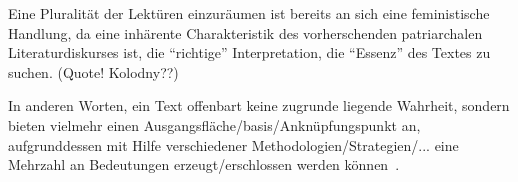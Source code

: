 Eine Pluralität der Lektüren einzuräumen ist bereits an sich eine feministische Handlung,
da eine inhärente Charakteristik des vorherschenden patriarchalen Literaturdiskurses ist, die ``richtige'' Interpretation, die ``Essenz'' des Textes zu suchen. (Quote! Kolodny??)
\begin{comment}
   * Pluralität (vlt in die Intro vorziehen)
     Annette Kolodny: "In my view, our purpose is not and should not be the formulation of any single reading method or potentially procrustean set of critical procedures[...] Instead, as I se it, our task is to initiate nothing less than a playful pluralism, responsice to the possibilities of multiple critical schools and methods, but captive of none.."

    ** Annette Kolodny: "we appropriate meaning from a text according to what we need (or desire) or, in other words, according to the critical assumptions or predispositions (conscious or not) that we bring to it. And we appropriate different meanings, or report different gleanings, at different times-even from the same text-according to our changed assumptions, circumstances, and requirements."
    ** Annette Kolodny: "It can provide that, but, I must add, too often it does not. Frequently our reading habits become fixed" <--- relation zum Kanon
\end{comment}

In anderen Worten, ein Text offenbart keine zugrunde liegende Wahrheit, sondern bieten vielmehr einen Ausgangsfläche/basis/Anknüpfungspunkt an, aufgrunddessen mit Hilfe verschiedener Methodologien/Strategien/... eine Mehrzahl an Bedeutungen erzeugt/erschlossen werden können~\cite{Beehler1988}.

\begin{comment}
[Beehler1988]
"Consequently, what we teach in the English class-
room is not "literature" but ways of reading. By
helping students to identify different methods,
different positions from which to view a work, we
help them to realize that texts do not "reveal"
truth: they simply provide the field upon which
meanings can be produced."
\end{comment}

